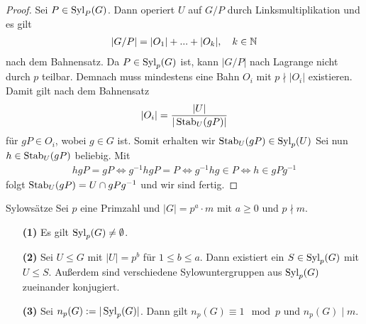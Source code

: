 \begin{proof}
	Sei $P \in \operatorname{Syl}_P(G)$. Dann operiert $U$ auf $G/P$ durch Linksmultiplikation und es gilt
	\begin{align*}
	| G/P| = |O_1| + ... + |O_k|, \quad k \in \mathbb{N}
	\end{align*}
	nach dem Bahnensatz.
	Da $P \in \operatorname{Syl}_p(G)$ ist, kann $|G/P|$ nach Lagrange nicht durch $p$ teilbar.
	Demnach muss mindestens eine Bahn $O_i$ mit $p \nmid | O_i |$ existieren. 
	Damit gilt nach dem Bahnensatz
	\begin{align*}
	|O_i| = \frac{|U|}{|\operatorname{Stab}_{U}(gP)|}
	\end{align*}
	für $gP \in O_i$, wobei $g \in G$ ist. 
	Somit erhalten wir $\operatorname{Stab}_U(gP) \in \operatorname{Syl}_p(U)$
	Sei nun $h \in \operatorname{Stab}_U(gP)$ beliebig.
	Mit 
	\begin{align*}
	hgP = g P
	\Leftrightarrow g^{-1}hg P = P
	\Leftrightarrow g^{-1}hg \in P
	\Leftrightarrow h \in g P g^{-1}
	\end{align*}
	folgt $\operatorname{Stab}_U(gP) = U \cap g P g^{-1}$ und wir sind fertig.
\end{proof}

\begin{genericthm}{Sylowsätze} \label{skript:6.4} 
	Sei $p$ eine Primzahl und $| G | = p^a \cdot m$ mit $a \geq 0$ und $p \nmid m$.
	\begin{enumerate}
		\item[\textbf{(1)}]
		Es gilt $\operatorname{Syl}_p(G) \neq \emptyset$.
		
		\item[\textbf{(2)}]
		Sei $U \leq G$ mit $|U| = p^b$ für $1 \leq b \leq a$.
		Dann existiert ein $S \in \operatorname{Syl}_p(G)$ mit $U \leq S$.
		Außerdem sind verschiedene Sylowuntergruppen aus $\operatorname{Syl}_p(G)$ zueinander konjugiert.
		
		\item[\textbf{(3)}]
		Sei $n_p(G) := | \operatorname{Syl}_p(G)|$.
		Dann gilt $n_p(G) \equiv 1 \mod p$ und $n_p(G) \mid m$.
	\end{enumerate}
\end{genericthm}

